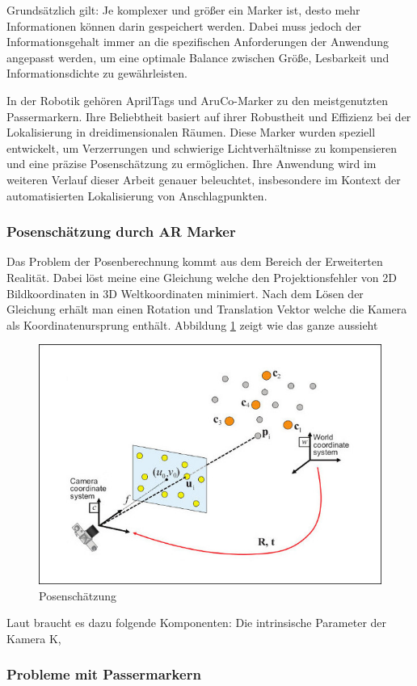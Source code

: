 Grundsätzlich gilt: Je komplexer und größer ein Marker ist, desto mehr Informationen können
darin gespeichert werden. Dabei muss jedoch der Informationsgehalt immer an die spezifischen 
Anforderungen der Anwendung angepasst werden, um eine optimale Balance zwischen Größe, Lesbarkeit 
und Informationsdichte zu gewährleisten.

In der Robotik gehören AprilTags und AruCo-Marker zu den meistgenutzten Passermarkern. 
Ihre Beliebtheit basiert auf ihrer Robustheit und Effizienz bei der Lokalisierung in 
dreidimensionalen Räumen. Diese Marker wurden speziell entwickelt, um Verzerrungen und 
schwierige Lichtverhältnisse zu kompensieren und eine präzise Posenschätzung zu ermöglichen. 
Ihre Anwendung wird im weiteren Verlauf dieser Arbeit genauer beleuchtet, insbesondere im 
Kontext der automatisierten Lokalisierung von Anschlagpunkten.

\clearpage
\subsubsection{Posenschätzung durch AR Marker}
Das Problem der Posenberechnung kommt aus dem Bereich der Erweiterten Realität.
Dabei löst meine eine Gleichung welche den Projektionsfehler von 2D Bildkoordinaten 
in 3D Weltkoordinaten minimiert. Nach dem Lösen der Gleichung erhält man einen Rotation
und Translation Vektor welche die Kamera als Koordinatenursprung enthält.
Abbildung \ref{fig:pose} zeigt wie das ganze aussieht

\begin{figure}[H]
    \centering
    \includegraphics[width=0.5\linewidth]{graphics/pose.png}
    \caption{Posenschätzung}
    \label{fig:pose}
\end{figure}

Laut \cite{pose} braucht es dazu folgende Komponenten: Die intrinsische Parameter der Kamera K,
    

\subsubsection{Probleme mit Passermarkern}




